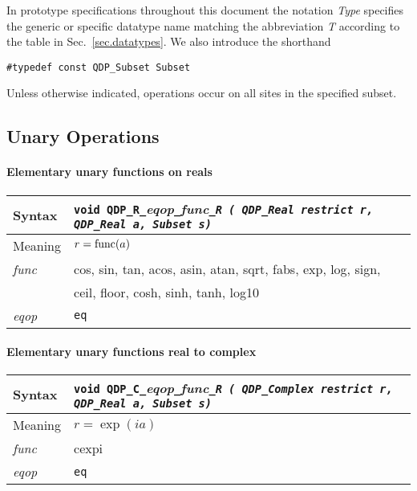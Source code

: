 \documentclass{article}
\newcommand{\tReal}{QDP\ttdash Real }
\newcommand{\tComplex}{QDP\ttdash Complex }
\newcommand{\namespace}{QDP}
\newcommand{\ttdash}{{\tt \_}}
\newcommand{\extraarg}{, Subset s}
\newcommand{\protoUnaryQualCR}[1]{{\tt void \namespace}\ttdash{\tt C}\ttdash{\it eqop}\ttdash#1\ttdash{\tt R ( \tComplex }{\tt *restrict r, \tReal }{\tt *a\extraarg)}}
\newcommand{\protoUnaryQualRR}[1]{{\tt void \namespace}\ttdash{\tt R}\ttdash{\it eqop}\ttdash#1\ttdash{\tt R ( \tReal }{\tt *restrict r, \tReal }{\tt *a\extraarg)}}
\begin{document}
In prototype specifications throughout this document the notation {\it
Type} specifies the generic or specific datatype name matching the
abbreviation {\it T} according to the table in
Sec.~\ref{sec.datatypes}.  We also introduce the shorthand
%
\begin{verbatim}
#typedef const QDP_Subset Subset
\end{verbatim}
%
Unless otherwise indicated, operations occur on all sites in the
specified subset.
 
\subsection{Unary Operations}

\paragraph{Elementary unary functions on reals}

\begin{flushleft}
  \begin{tabular}{|l|l|}
  \hline
  Syntax      & \protoUnaryQualRR{\it func}  \\
  \hline
  Meaning     & $r = {\rm func}(a)$ \\
  \hline
  {\it func}  & cos, sin, tan, acos, asin, atan,
		sqrt, fabs, exp, log, sign, \\
              & ceil, floor, cosh, sinh, tanh, log10 \\
  \hline
  {\it eqop}  & {\tt eq} \\
  \hline
  \end{tabular}
\end{flushleft}

\paragraph{Elementary unary functions real to complex}

\begin{flushleft}
  \begin{tabular}{|l|l|}
  \hline
  Syntax      & \protoUnaryQualCR{\it func}  \\
  \hline
  Meaning     & $r = \exp(ia)$ \\
  \hline
  {\it func}  & cexpi \\
  \hline
  {\it eqop}  & {\tt eq} \\
  \hline
  \end{tabular}
\end{flushleft}
\end{document}
